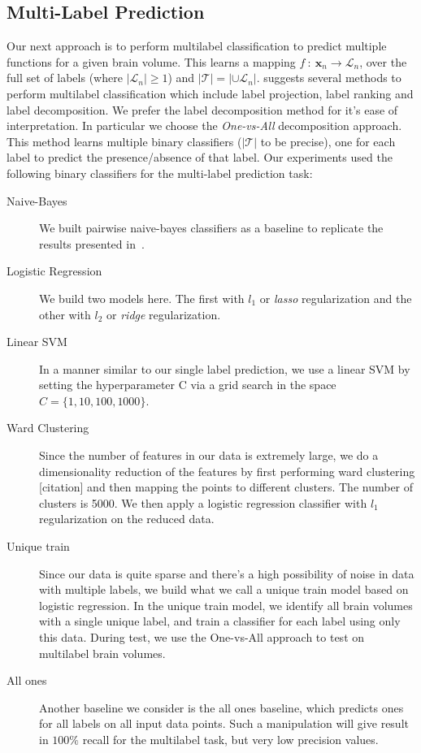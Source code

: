 \documentclass{article} %
\begin{document}
 \subsection{Multi-Label Prediction} \label{subsec:method_multi}
Our next approach is to perform multilabel classification to predict multiple functions for a given brain volume. This learns a mapping $f\ :\ \mathbf{x}_n \rightarrow \mathcal{L}_n$, over the full set of labels (where $|\mathcal{L}_n| \geq 1$)  and $|\mathcal{T}| =| \cup \mathcal{L}_n|$. \cite{zhang2013review} suggests several methods to perform multilabel classification which include label projection, label ranking and label decomposition. We prefer the label decomposition method for it's ease of interpretation. In particular we choose the \textit{One-vs-All} decomposition approach. This method learns multiple binary classifiers ($|\mathcal{T}|$ to be precise), one for each label to predict the presence/absence of that label. Our experiments used the following binary classifiers for the multi-label prediction task:
  \begin{description}
  \item[Naive-Bayes] We built pairwise naive-bayes classifiers as a baseline to replicate the results presented in~\cite{yarkoni2011large}.
  \item[Logistic Regression] We build two models here. The first with $l_1$ or \textit{lasso} regularization and the other with $l_2$  or \textit{ridge} regularization. 
  \item[Linear SVM] In a manner similar to our single label prediction, we use a linear SVM by setting the hyperparameter C via a grid search in the space $C = \{1, 10, 100, 1000\}$.
  \item[Ward Clustering] Since the number of features in our data is extremely large, we do a dimensionality reduction of the features by first performing ward clustering [citation] and then mapping the points to different clusters. The number of clusters is 5000. We then apply a logistic regression classifier with $l_1$ regularization on the reduced data.
  \item[Unique train] Since our data is quite sparse and there's a high possibility of noise in data with multiple labels, we build what we call a unique train model based on logistic regression. In the unique train model, we identify all brain volumes with a single unique label, and train a classifier for each label using only this data. During test, we use the One-vs-All approach to test on multilabel brain volumes.
  \item[All ones] Another baseline we consider is the all ones baseline, which predicts ones for all labels on all input data points. Such a manipulation will give result in $100\%$ recall for the multilabel task, but very low precision values.
  \end{description}
\end{document}
